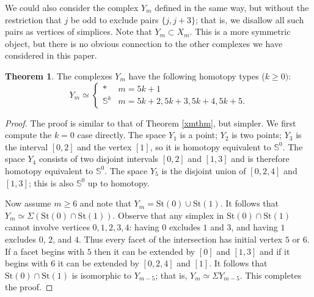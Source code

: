 \documentclass{amsart}
\theoremstyle{definition}
\newtheorem{theorem}{Theorem}[section]
\newcommand{\zs}{{\mathbb S}}
\begin{document}
We could also consider the complex $Y_m$ defined in the same way, but without the restriction that $j$ be odd to exclude pairs $\{j,j+3\}$; that is, we disallow all such pairs as vertices of simplices. Note that $Y_m\subset X_m$. This is a more symmetric object, but there is no obvious connection to the other complexes we have considered in this paper. 

\begin{theorem}\label{ymthm}
    The complexes $Y_m$ have the following homotopy types ($k\ge 0)$:
    $$Y_m\simeq \begin{cases}
        \ast & m=5k+1 \\
        \zs^k & m=5k+2, 5k+3, 5k+4, 5k+5.
    \end{cases}$$
\end{theorem}

\begin{proof}
    The proof is similar to that of Theorem \ref{xmthm}, but simpler. We first compute the $k=0$ case directly. The space $Y_1$ is a point; $Y_2$ is two points; $Y_3$ is the interval $[0,2]$ and the vertex $[1]$, so it is homotopy equivalent to $\zs^0$. The space $Y_4$ consists of two disjoint intervals $[0,2]$ and $[1,3]$ and is therefore homotopy equivalent to $\zs^0$. The space $Y_5$ is the disjoint union of $[0,2,4]$ and $[1,3]$; this is also $\zs^0$ up to homotopy.

    Now assume $m\ge 6$ and note that $Y_m=\text{St}(0)\cup \text{St}(1)$. It follows that $Y_m\simeq \Sigma(\text{St}(0)\cap\text{St}(1))$. Observe that any simplex in $\text{St}(0)\cap\text{St}(1)$ cannot involve vertices $0,1,2,3,4$: having $0$ excludes $1$ and $3$, and having $1$ excludes $0$, $2$, and $4$. Thus every facet of the intersection has initial vertex $5$ or $6$. If a facet begins with $5$ then it can be extended by $[0]$ and $[1,3]$ and if it begins with $6$ it can be extended by $[0,2,4]$ and $[1]$. It follows that $\text{St}(0)\cap\text{St}(1)$ is isomorphic to $Y_{m-5}$; that is, $Y_m\simeq \Sigma Y_{m-5}$. This completes the proof.
\end{proof}
\end{document}
